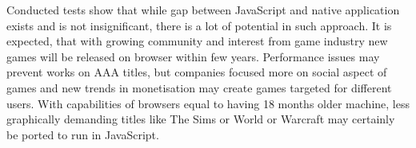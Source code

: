 Conducted tests show that while gap between JavaScript and native application exists and is not insignificant, there is a lot of potential in such approach. It is expected, that with growing community and interest from game industry new games will be released on browser within few years. Performance issues may prevent works on AAA titles, but companies focused more on social aspect of games and new trends in monetisation may create games targeted for different users. With capabilities of browsers equal to having 18 months older machine, less graphically demanding titles like The Sims or World or Warcraft may certainly be ported to run in JavaScript.


